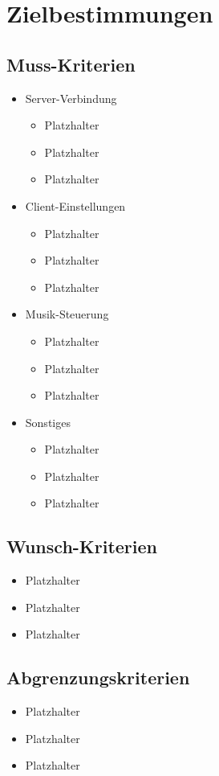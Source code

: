 \chapter{Zielbestimmungen}
\section{Muss-Kriterien}
\renewcommand{\labelitemi}{•}
\begin{itemize}
	\item Server-Verbindung
	\begin{itemize}
		\item Platzhalter
		\item Platzhalter
		\item Platzhalter
	\end{itemize}
	\item Client-Einstellungen
	\begin{itemize}
		\item Platzhalter
		\item Platzhalter
		\item Platzhalter
	\end{itemize}
	\item Musik-Steuerung
	\begin{itemize}
		\item Platzhalter
		\item Platzhalter
		\item Platzhalter
	\end{itemize}
	\item Sonstiges
	\begin{itemize}
		\item Platzhalter
		\item Platzhalter
		\item Platzhalter
	\end{itemize}
\end{itemize}
\section{Wunsch-Kriterien}
\begin{itemize}
		\item Platzhalter
		\item Platzhalter
		\item Platzhalter
\end{itemize}
\section{Abgrenzungskriterien}
\begin{itemize}
		\item Platzhalter
		\item Platzhalter
		\item Platzhalter
\end{itemize}